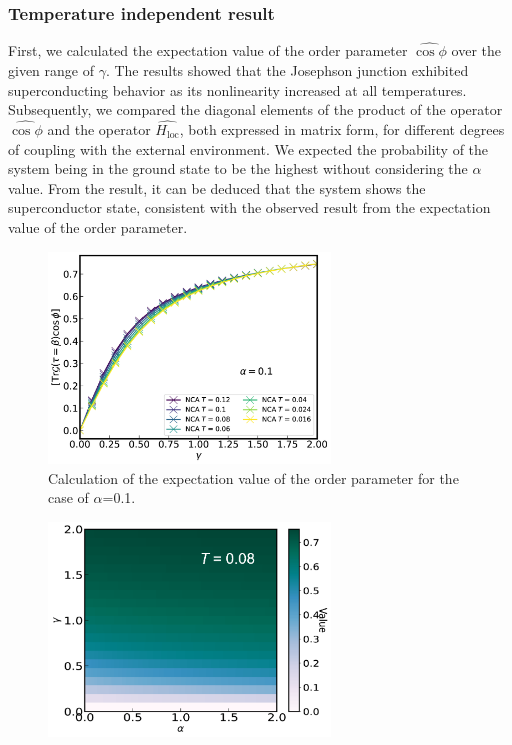 \documentclass{article}
\begin{document}
\begin{spacing}{1.3}
\subsubsection*{Temperature independent result}
First, we calculated the expectation value of the order parameter $\hat{\cos\phi}$ 
over the given range of $\gamma$. The results showed that the Josephson junction exhibited superconducting behavior 
as its nonlinearity increased at all temperatures. Subsequently, we compared the diagonal elements of the product 
of the operator $\hat{\cos\phi}$ and the operator $\hat{H_{\text{loc}}}$, both expressed in matrix form, 
for different degrees of coupling with the external environment. We expected the probability of the system 
being in the ground state to be the highest without considering the $\alpha$ value. From the result, 
it can be deduced that the system shows the superconductor state, consistent with the observed
result from the expectation value of the order parameter.
\pagebreak
\begin{figure}[H]
  \vfill
  \centerline{\includegraphics[width=7.5cm]{TexFigure/4/4_3_01_Expec_alp_0.1.png}}
  \caption{Calculation of the expectation value of the order parameter for the case of $\alpha$=0.1.}
  \label{fig:Order1}
  \vfill
\end{figure}
\begin{figure}[H]
  \vfill
  \centerline{\includegraphics[width=7.5cm]{TexFigure/4/4_3_02_Temp.png}}

\end{figure}
\end{spacing}
\end{document}
